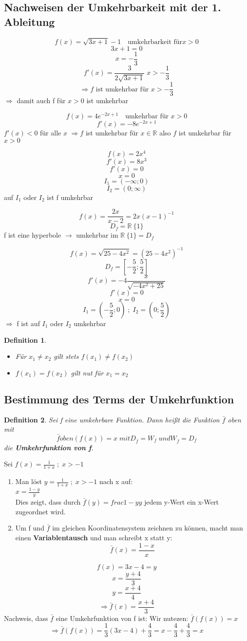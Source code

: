 \documentclass{book}
\newtheorem{definition}{Definition}
\begin{document}
\subsection{Nachweisen der Umkehrbarkeit mit der 1. Ableitung}

\[f(x) = \sqrt{3x + 1} -1 \quad \text{umkehrbarkeit für} x > 0\]
\[3x+1 = 0\]
\[x = -\frac 13\]
\[f'(x) = \frac 3{2\sqrt{3x+1}} \; x>-\frac13\]
\[ \Rightarrow f\text{ ist umkehrbar für } x > -\frac13\]
$\Rightarrow$ damit auch f für $x>0$ ist umkehrbar

\[f(x) = 4e^{-2x+1}\quad \text{umkehrbar für } x > 0\]
\[f'(x) = -8 e^{-2x+1}\]
$f'(x)<0$ für alle $x$
$\Rightarrow f $ ist umkehrbar für $x \in \mathbb{R}$
also $f$ ist umkehrbar für $x>0$

\[f(x) = 2x^4\]
\[f'(x) = 8x^3\]
\[f'(x) = 0\]
\[x = 0\]
\[I_1 = (-\infty;0)\]
\[I_2 = (0;\infty)\]
auf $I_1$ oder $I_2$ ist f umkehrbar


\[f(x) = \frac{2x}{x-2} = 2x (x-1)^{-1}\]
\[D_f = \mathbb{R} \ \{1\}\]
f ist eine hyperbole $\rightarrow$ umkehrbar im $\mathbb{R} \ \{1\} = D_f$

\[f(x) = \sqrt{25-4x^2} = (25-4x^2)^{-1}\]
\[D_f = [-\frac 52; \frac52]\]
\[f'(x) = -4\frac x{\sqrt{-4x^2+25}}\]
\[f'(x) = 0\]
\[x = 0\]
\[ I_1 = (-\frac 52;0) \; ; \; I_2 = (0;\frac 52)\]
$\Rightarrow$ f ist auf $I_1$ oder $I_2$ umkehrbar 

\begin{definition}
\begin{itemize}
\item Für $x_1 \not = x_2$ gilt stets $f(x_1) \not = f(x_2)$
\item $f(x_1) = f(x_2) $ gilt nut für $x_1 =  x_2$
\end{itemize}
\end{definition}

\subsection{Bestimmung des Terms der Umkehrfunktion}

\begin{definition}
Sei f eine umkehrbare Funktion. Dann heißt die Funktion $\bar{f}$ oben mit
\[\bar{f} oben (f(x)) = x \; mit D_{\bar{f}} = W_f \; und W_{\bar{f}} = D_f\]
die \textbf{Umkehrfunktion von f}.
\end{definition}

Sei $f(x) = \frac 1{1+x} \; ; \; x > -1$
\begin{enumerate}
\item Man löst $y = \frac 1{1+x} \; ; \; x > -1$ nach x auf: 
\\
$ x = \frac {1-y}y$
\\
Dies zeigt, dass durch $\bar{f}(y) = frac {1-y}y$ jedem y-Wert ein x-Wert zugeordnet wird.
\item Um f und $\bar{f}$ im gleichen Koordinatensystem zeichnen zu können, macht man einen  \textbf{Variablentausch} und man schreibt x statt y:
\[\bar{f}(x) = \frac {1-x}x\]
\end{enumerate}

\[f(x) = 3x - 4 = y \]
\[x = \frac {y+4}3\]
\[y = \frac {x+4}4\]
\[ \Rightarrow \bar{f} (x) = \frac{x+4}3\]
Nachweis, dass $\bar{f}$ eine Umkehrfunktion von f ist:
Wir nutezen: $\bar{f}(f(x)) = x$
\[\Rightarrow \bar{f}(f(x)) = \frac1 3 (3x-4) +\frac43 = x - \frac43 + \frac43 = x\]
\end{document}
